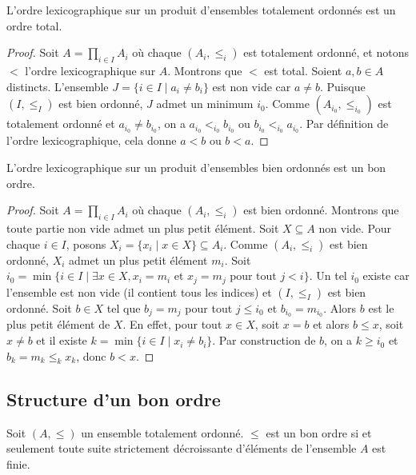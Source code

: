 \begin{proposition}
    L'ordre lexicographique sur un produit d'ensembles totalement ordonnés est un ordre total.
\end{proposition}
\begin{proof}
    Soit $A = \prod_{i \in I} A_i$ où chaque $(A_i, \leq_i)$ est totalement ordonné, et notons $<$ l'ordre lexicographique sur $A$. Montrons que $<$ est total. Soient $a, b \in A$ distincts. L'ensemble $J = \{i \in I \mid a_i \neq b_i\}$ est non vide car $a \neq b$. Puisque $(I, \leq_I)$ est bien ordonné, $J$ admet un minimum $i_0$. Comme $(A_{i_0}, \leq_{i_0})$ est totalement ordonné et $a_{i_0} \neq b_{i_0}$, on a $a_{i_0} <_{i_0} b_{i_0}$ ou $b_{i_0} <_{i_0} a_{i_0}$. Par définition de l'ordre lexicographique, cela donne $a < b$ ou $b < a$.
\end{proof}
\begin{proposition}
    L'ordre lexicographique sur un produit d'ensembles bien ordonnés est un bon ordre.
\end{proposition}
\begin{proof}
   Soit $A = \prod_{i \in I} A_i$ où chaque $(A_i, \leq_i)$ est bien ordonné. Montrons que toute partie non vide admet un plus petit élément. Soit $X \subseteq A$ non vide. Pour chaque $i \in I$, posons $X_i = \{x_i \mid x \in X\} \subseteq A_i$. Comme $(A_i, \leq_i)$ est bien ordonné, $X_i$ admet un plus petit élément $m_i$. Soit $i_0 = \min\{i \in I \mid \exists x \in X, x_i = m_i \text{ et } x_j = m_j \text{ pour tout } j < i\}$. Un tel $i_0$ existe car l'ensemble est non vide (il contient tous les indices) et $(I, \leq_I)$ est bien ordonné. Soit $b \in X$ tel que $b_j = m_j$ pour tout $j \leq i_0$ et $b_{i_0} = m_{i_0}$. Alors $b$ est le plus petit élément de $X$. En effet, pour tout $x \in X$, soit $x = b$ et alors $b \leq x$, soit $x \neq b$ et il existe $k = \min\{i \in I \mid x_i \neq b_i\}$. Par construction de $b$, on a $k \geq i_0$ et $b_k = m_k \leq_k x_k$, donc $b < x$. 
\end{proof}

\subsection{Structure d'un bon ordre}

\begin{lemme}
    Soit $(A,\le)$ un ensemble totalement ordonné. $\le$ est un bon ordre si et seulement toute suite strictement décroissante d'éléments de l'ensemble $A$ est finie.
\end{lemme}

